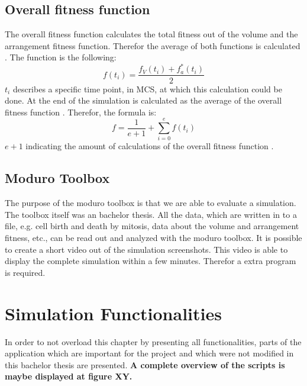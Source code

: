 \subsection{Overall fitness function}
The overall fitness function calculates the total fitness out of the volume and the arrangement fitness function. Therefor the average of both functions is calculated \cite{Torelli2017}. The function is the following:
\begin{equation} 
f(t_{i}) = \dfrac{f_{V}(t_{i})+f_{a}^{*}(t_{i})}{2}
\end{equation}
$t_{i}$ describes a specific time point, in \ac{MCS}, at which this calculation could be done. At the end of the simulation is calculated as the average of the overall fitness function \cite{Torelli2017}. Therefor, the formula is:
\begin{equation} 
f = \dfrac{1}{e+1} + \sum_{i=0}^{e}{f(t_{i})}
\end{equation}
$e+1$ indicating the amount of calculations of the overall fitness function \cite{Torelli2017}.



\subsection{Moduro Toolbox}
The purpose of the moduro toolbox is that we are able to evaluate a simulation. The toolbox itself was an bachelor thesis. All the data, which are written in to a file, e.g. cell birth and death by mitosis, data about the volume and arrangement fitness, etc., can be read out and analyzed with the moduro toolbox.
It is possible to create a short video out of the simulation screenshots. This video is able to display the complete simulation within a few minutes. Therefor a extra program is required.




\section{Simulation Functionalities}
In order to not overload this chapter by presenting all functionalities, parts of the application which are important for the project and which were not modified in this bachelor thesis are presented. \textbf{A complete overview of the scripts is maybe displayed at figure XY.}


